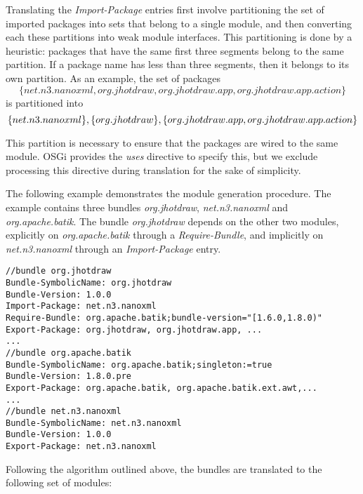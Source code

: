 Translating the \textit{Import-Package} entries first involve partitioning the set of imported 
packages into sets that belong to a single module, and then converting each these partitions into
weak module interfaces. This partitioning is done by a heuristic: packages that have the same first
three segments belong to the same partition. If a package name has less than three segments, then
it belongs to its own partition. As an example, the set of packages\\
\[
\{net.n3.nanoxml, org.jhotdraw, org.jhotdraw.app, org.jhotdraw.app.action\}
\]
is partitioned into\\
\[\{net.n3.nanoxml\}, \{org.jhotdraw\}, \\ \{org.jhotdraw.app, org.jhotdraw.app.action\}\]

This partition is necessary to ensure that the packages are wired to the same module. OSGi provides
the \textit{uses} directive to specify this, but we exclude processing this directive during translation 
for the sake of simplicity.

The following example demonstrates the module generation procedure. The example contains three bundles
\textit{org.jhotdraw}, \textit{net.n3.nanoxml} and \textit{org.apache.batik}. The bundle \textit{org.jhotdraw}
depends on the other two modules, explicitly on \textit{org.apache.batik} through a \textit{Require-Bundle}, 
and implicitly on \textit{net.n3.nanoxml} through an \textit{Import-Package} entry.

\begin{lstlisting}[caption=Bundle Translation Example]
//bundle org.jhotdraw
Bundle-SymbolicName: org.jhotdraw
Bundle-Version: 1.0.0
Import-Package: net.n3.nanoxml
Require-Bundle: org.apache.batik;bundle-version="[1.6.0,1.8.0)"
Export-Package: org.jhotdraw, org.jhotdraw.app, ...
...
//bundle org.apache.batik
Bundle-SymbolicName: org.apache.batik;singleton:=true
Bundle-Version: 1.8.0.pre
Export-Package: org.apache.batik, org.apache.batik.ext.awt,...
...
//bundle net.n3.nanoxml
Bundle-SymbolicName: net.n3.nanoxml
Bundle-Version: 1.0.0
Export-Package: net.n3.nanoxml
\end{lstlisting}

Following the algorithm outlined above, the bundles are translated to the following set of modules:

